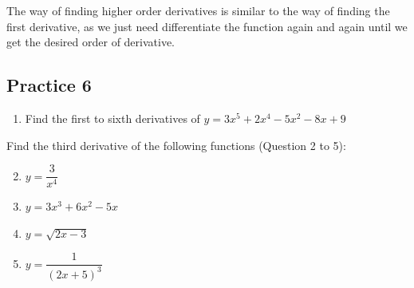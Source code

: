 \documentclass[12pt]{report}
\begin{document}
The way of finding higher order derivatives is similar to the way of finding
the first derivative, as we just need differentiate the function again and
again until we get the desired order of derivative.

\subsection{Practice 6}
\setlength{\columnseprule}{1pt}
\setlength{\columnsep}{24pt}
\begin{multicols}{2}
  \begin{enumerate}[leftmargin=*]
    \item Find the first to sixth derivatives of $y=3x^{5}+2x^{4}-5x^{2}-8x+9$
  \end{enumerate}
  \noindent Find the third derivative of the following functions (Question 2 to 5):
  \begin{enumerate}
    \setcounter{enumi}{1}
    \item $y={\dfrac{3}{x^{4}}}$
    \item $y=3x^{3}+6x^{2}-5x$
    \item $y={\sqrt{2x-3}}$
    \item $y={\dfrac{1}{{(2x+5)}^{3}}}$
  \end{enumerate}
\end{multicols}
\end{document}
